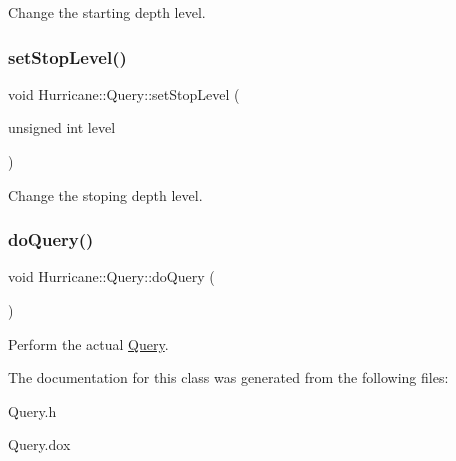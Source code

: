 Change the starting depth level. \mbox{\label{classHurricane_1_1Query_a70359c71d7dc7e3f17d0a29c8208c92f}} 
\subsubsection{\texorpdfstring{set\+Stop\+Level()}{setStopLevel()}}
{\footnotesize\ttfamily void Hurricane\+::\+Query\+::set\+Stop\+Level (\begin{DoxyParamCaption}\item[{unsigned int}]{level }\end{DoxyParamCaption})\hspace{0.3cm}{\ttfamily [inline]}}

Change the stoping depth level. \mbox{\label{classHurricane_1_1Query_a2ca5bf71c7b35e14c4a64488a5e21bc6}} 
\subsubsection{\texorpdfstring{do\+Query()}{doQuery()}}
{\footnotesize\ttfamily void Hurricane\+::\+Query\+::do\+Query (\begin{DoxyParamCaption}{ }\end{DoxyParamCaption})\hspace{0.3cm}{\ttfamily [virtual]}}

Perform the actual \mbox{\hyperlink{classHurricane_1_1Query}{Query}}. 

The documentation for this class was generated from the following files\+:\begin{DoxyCompactItemize}
\item 
Query.\+h\item 
Query.\+dox\end{DoxyCompactItemize}
